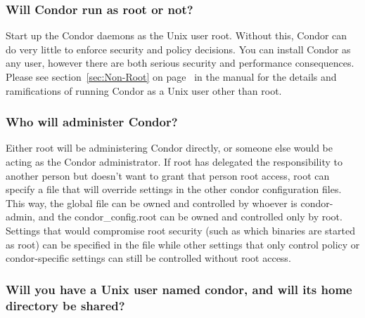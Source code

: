\subsubsection{Will Condor run as root or not?}

Start up the Condor daemons as the Unix user root.
Without this,
Condor can do very little to enforce security and policy
decisions.
You can install Condor as any user,
however there are both serious security and performance consequences.
Please see section~\ref{sec:Non-Root} on page~\pageref{sec:Non-Root}
in the manual for the details and ramifications of
running Condor as a Unix user other than root.

\subsubsection{Who will administer Condor?}



Either root will be administering Condor directly, or someone else
would be acting as the Condor administrator.  If root has delegated
the responsibility to another person but doesn't want to grant that
person root access, root can specify a 
 file that
will override settings in the other condor configuration
files.  This way,
the global 
 file can be owned and controlled by whoever
is condor-admin, and the 
condor\_config.root can be owned and
controlled only by root.  Settings that would compromise root security
(such as which binaries are started as root) can be specified in the
 file while other settings that only control policy
or condor-specific settings can still be controlled without root
access.  

\subsubsection{Will you have a Unix user named condor, and will its home
directory be shared? }

